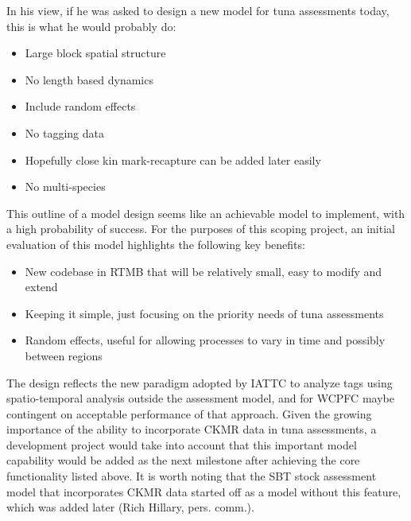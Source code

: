 \documentclass{SCreport}
\begin{document}
\vspace{2ex}

In his view, if he was asked to design a new model for tuna assessments today,
this is what he would probably do:

\begin{itemize}
  \item Large block spatial structure\\[-4.5ex]
  \item No length based dynamics\\[-4.5ex]
  \item Include random effects\\[-4.5ex]
  \item No tagging data\\[-4.5ex]
  \item Hopefully close kin mark-recapture can be added later easily\\[-4.5ex]
  \item No multi-species
\end{itemize}

\vspace{2ex}

This outline of a model design seems like an achievable model to implement, with
a high probability of success. For the purposes of this scoping project, an
initial evaluation of this model highlights the following key benefits:

\begin{itemize}
  \item New codebase in RTMB that will be relatively small, easy to modify and
  extend\\[-4.5ex]
  \item Keeping it simple, just focusing on the priority needs of tuna
  assessments\\[-4.5ex]
  \item Random effects, useful for allowing processes to vary in time and
  possibly between regions
\end{itemize}

\vspace{2ex}

The design reflects the new paradigm adopted by IATTC to analyze tags using
spatio-temporal analysis outside the assessment model, and for WCPFC maybe
contingent on acceptable performance of that approach. Given the growing
importance of the ability to incorporate CKMR data in tuna assessments, a
development project would take into account that this important model capability
would be added as the next milestone after achieving the core functionality
listed above. It is worth noting that the SBT stock assessment model that
incorporates CKMR data started off as a model without this feature, which was
added later (Rich Hillary, pers. comm.).
\end{document}
